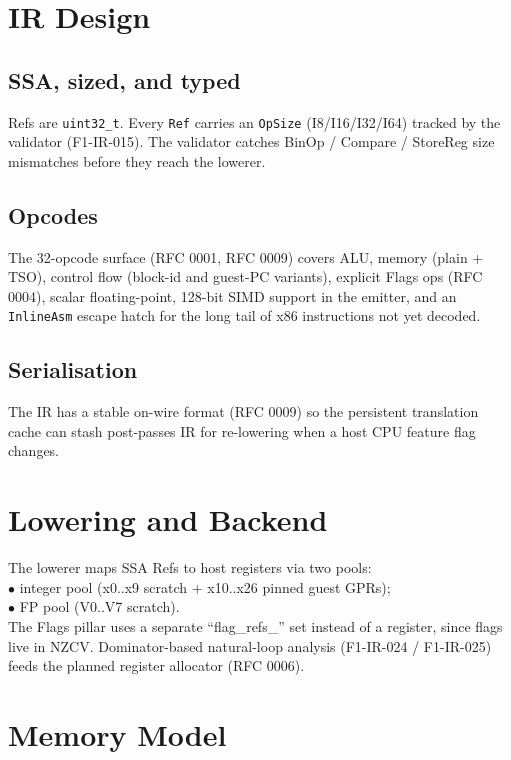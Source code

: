 \documentclass[11pt,a4paper]{article}
\begin{document}
\section{IR Design}
\label{sec:ir}

\subsection{SSA, sized, and typed}
Refs are \texttt{uint32\_t}. Every \texttt{Ref} carries an
\texttt{OpSize} (I8/I16/I32/I64) tracked by the validator
(F1-IR-015). The validator catches BinOp / Compare / StoreReg size
mismatches before they reach the lowerer.

\subsection{Opcodes}
The 32-opcode surface (RFC 0001, RFC 0009) covers ALU, memory
(plain + TSO), control flow (block-id and guest-PC variants),
explicit Flags ops (RFC 0004), scalar floating-point, 128-bit SIMD
support in the emitter, and an \texttt{InlineAsm} escape hatch
for the long tail of x86 instructions not yet decoded.

\subsection{Serialisation}
The IR has a stable on-wire format (RFC 0009) so the persistent
translation cache can stash post-passes IR for re-lowering when a
host CPU feature flag changes.

\section{Lowering and Backend}
\label{sec:backend}

The lowerer maps SSA Refs to host registers via two pools: \\
\(\bullet\) integer pool (x0..x9 scratch + x10..x26 pinned guest
GPRs); \\
\(\bullet\) FP pool (V0..V7 scratch). \\
The Flags pillar uses a separate ``flag\_refs\_'' set instead of a
register, since flags live in NZCV. Dominator-based natural-loop
analysis (F1-IR-024 / F1-IR-025) feeds the planned register
allocator (RFC 0006).

\section{Memory Model}
\label{sec:memory}
\end{document}
